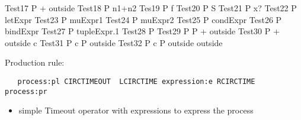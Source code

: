 \documentclass{article}
\begin{document}
\begin{circus}
   \circprocess Test17 \circdef P \circendby {} + outside \rcirctime
   \also
   \circprocess Test18 \circdef P \circendby \lcirctime n1+n2 \rcirctime 
   \also
   \circprocess Tes19 \circdef P \circendby \lcirctime f \rcirctime
   \also
   \circprocess Test20 \circdef P \circendby \lcirctime \theta S \rcirctime
   \also
   \circprocess Test21 \circdef P \circendby \lcirctime x? \rcirctime
   \also
   \circprocess Test22 \circdef P \circendby \lcirctime letExpr \rcirctime
   \also
   \circprocess Test23 \circdef P \circendby \lcirctime muExpr1 \rcirctime
   \also
   \circprocess Test24 \circdef P \circendby \lcirctime muExpr2 \rcirctime
   \also
   \circprocess Test25 \circdef P \circendby \lcirctime condExpr \rcirctime
   \also
   \circprocess Test26 \circdef P \circendby \lcirctime bindExpr \rcirctime
   \also
   \circprocess Test27 \circdef P \circendby \lcirctime tupleExpr.1 \rcirctime
   \also
   \circprocess Test28 \circdef P \circendby {}   \rcirctime
   \also
   \circprocess Test29 \circdef  P \circseq P \circendby {} + outside \rcirctime
   \also
   \circprocess Test30 \circdef P \circendby {} + outside \rcirctime \circhide   
   \lchanset c \rchanset
   \also
   \circprocess Test31 \circdef  P \lpar \lchanset c \rchanset \rpar P \circendby \lcirctime 
   outside \rcirctime
   \also
   \circprocess Test32 \circdef  P \lpar \lchanset c \rchanset \rpar P \circendby  \lcirctime 
   outside \rcirctime  \circendby \lcirctime outside \rcirctime 
\end{circus}

Production rule:
\begin{verbatim}
   process:pl CIRCTIMEOUT  LCIRCTIME expression:e RCIRCTIME  process:pr
\end{verbatim}

\begin{itemize}
   \item simple Timeout operator with expressions to express the process 
\end{itemize}
\end{document}
